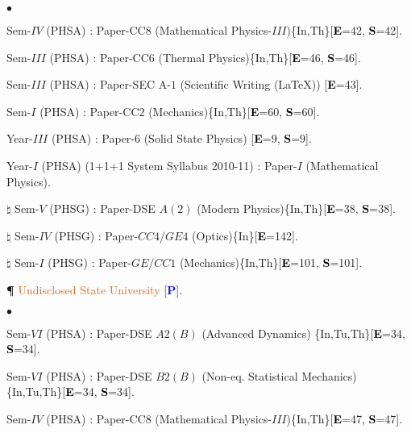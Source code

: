 \documentclass[margin,line]{res}
\newenvironment{list1}{
  \begin{list}{\ding{113}}{%
      \setlength{\itemsep}{0in}
      \setlength{\parsep}{0in} \setlength{\parskip}{0in}
      \setlength{\topsep}{0in} \setlength{\partopsep}{0in} 
      \setlength{\leftmargin}{0.17in}}}{\end{list}}
\newenvironment{list2}{
  \begin{list}{$\bullet$}{%
      \setlength{\itemsep}{0in}
      \setlength{\parsep}{0in} \setlength{\parskip}{0in}
      \setlength{\topsep}{0in} \setlength{\partopsep}{0in} 
      \setlength{\leftmargin}{0.2in}}}{\end{list}}
\begin{document}
\begin{resume}
\begin{list2}
\item Sem-$IV$ (PHSA) : Paper-CC8 (Mathematical Physics-$III$)\textcolor{alizarin}{\{In,Th\}}[\textcolor{black}{\bf E}=42, \textcolor{black}{\bf S}=42]. 
\item Sem-$III$ (PHSA) : Paper-CC6 (Thermal Physics)\textcolor{alizarin}{\{In,Th\}}[\textcolor{black}{\bf E}=46, \textcolor{black}{\bf S}=46]. 
\item Sem-$III$ (PHSA) : Paper-SEC A-$1$ (Scientific Writing (\LaTeX)) [\textcolor{black}{\bf E}=43]. 
\item Sem-$I$ (PHSA) : Paper-CC$2$ (Mechanics)\textcolor{alizarin}{\{In,Th\}}[\textcolor{black}{\bf E}=60, \textcolor{black}{\bf S}=60]. 
\item Year-$III$ (PHSA) : Paper-6 (Solid State Physics) [\textcolor{black}{\bf E}=9, \textcolor{black}{\bf S}=9]. 
\item Year-$I$ (PHSA) (1+1+1 System Syllabus 2010-11) : Paper-$I$ (Mathematical Physics). 
\item[$\pmb{\natural}$] Sem-$V$ (PHSG) : Paper-DSE $A(2)$ (Modern Physics)\textcolor{alizarin}{\{In,Th\}}[\textcolor{black}{\bf E}=38, \textcolor{black}{\bf S}=38].
\item[$\pmb{\natural}$] Sem-$IV$ (PHSG) : Paper-$CC4/GE4$ (Optics)\textcolor{alizarin}{\{In\}}[\textcolor{black}{\bf E}=142]. 
\item[$\pmb{\natural}$] Sem-$I$ (PHSG) : Paper-$GE/CC1$ (Mechanics)\textcolor{alizarin}{\{In,Th\}}[\textcolor{black}{\bf E}=101, 
      \textcolor{black}{\bf S}=101]. 
\item[{\bf \P}] \textcolor{chocolate}{Undisclosed State University} [\textcolor{blue}{\bf P}]. 
\end{list2}
\begin{list1}
\item[] \textcolor{iris}{}
\vspace{1mm}
\end{list1}
\begin{list2}
\item Sem-$VI$ (PHSA) : Paper-DSE $A2(B)$ (Advanced Dynamics) \textcolor{alizarin}{\{In,Tu,Th\}}[\textcolor{black}{\bf E}=34, 
      \textcolor{black}{\bf S}=34].
\item Sem-$VI$ (PHSA) : Paper-DSE $B2(B)$ (Non-eq. Statistical Mechanics)\textcolor{alizarin}{\{In,Tu,Th\}}[\textcolor{black}{\bf E}=34, 
      \textcolor{black}{\bf S}=34].
\item Sem-$IV$ (PHSA) : Paper-CC8 (Mathematical Physics-$III$)\textcolor{alizarin}{\{In,Th\}}[\textcolor{black}{\bf E}=47, \textcolor{black}{\bf S}=47]. 

\end{list2}
\end{resume}
\end{document}
